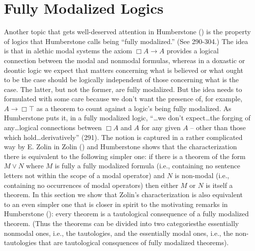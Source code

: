 \documentclass[
  11pt,
  letterpaper,
  DIV=11,
  numbers=noendperiod,
  twoside]{scrartcl}
\begin{document}
\section{Fully Modalized Logics}\label{fully-modalized-logics}

Another topic that gets well-deserved attention in Humberstone
() is the property of logics that
Humberstone calls being ``fully modalized.'' (See 290-304.) The idea is
that in alethic modal systems the axiom \(\Box A\rightarrow A\) provides
a logical connection between the modal and nonmodal formulas, whereas in
a doxastic or deontic logic we expect that matters concerning what is
believed or what ought to be the case should be logically independent of
those concerning what is the case. The latter, but not the former, are
fully modalized. But the idea needs to formulated with some care because
we don't want the presence of, for example, \(A\rightarrow \Box \top\)
as a theorem to count against a logic's being fully modalized. As
Humberstone puts it, in a fully modalized logic, ``\ldots we don't
expect\ldots the forging of any\ldots logical connections between
\(\Box A\) and \(A\) for any given \(A\) -- other than those which
hold\ldots derivatively'' (291). The notion is captured in a rather
complicated way by E. Zolin in Zolin ()
and Humberstone shows that the characterization there is equivalent to
the following simpler one: if there is a theorem of the form \(M\vee N\)
where \(M\) is fully a fully modalized formula (i.e., containing no
sentence letters not within the scope of a modal operator) and \(N\) is
non-modal (i.e., containing no occurrences of modal operators) then
either \(M\) or \(N\) is itself a theorem. In this section we show that
Zolin's characterization is also equivalent to an even simpler one that
is closer in spirit to the motivating remarks in Humberstone
(): every theorem is a tautological
consequence of a fully modalized theorem. (Thus the theorems can be
divided into two categoriesthe essentially nonmodal ones, i.e., the
tautologies, and the essentially modal ones, i.e., the non-tautologies
that are tautological consquences of fully modalized theorems).
\end{document}
